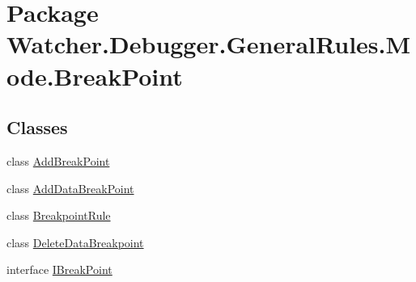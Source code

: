 \hypertarget{namespace_watcher_1_1_debugger_1_1_general_rules_1_1_mode_1_1_break_point}{\section{Package Watcher.\+Debugger.\+General\+Rules.\+Mode.\+Break\+Point}
\label{namespace_watcher_1_1_debugger_1_1_general_rules_1_1_mode_1_1_break_point}
}
\subsection*{Classes}
\begin{DoxyCompactItemize}
\item 
class \hyperlink{class_watcher_1_1_debugger_1_1_general_rules_1_1_mode_1_1_break_point_1_1_add_break_point}{Add\+Break\+Point}
\item 
class \hyperlink{class_watcher_1_1_debugger_1_1_general_rules_1_1_mode_1_1_break_point_1_1_add_data_break_point}{Add\+Data\+Break\+Point}
\item 
class \hyperlink{class_watcher_1_1_debugger_1_1_general_rules_1_1_mode_1_1_break_point_1_1_breakpoint_rule}{Breakpoint\+Rule}
\item 
class \hyperlink{class_watcher_1_1_debugger_1_1_general_rules_1_1_mode_1_1_break_point_1_1_delete_data_breakpoint}{Delete\+Data\+Breakpoint}
\item 
interface \hyperlink{interface_watcher_1_1_debugger_1_1_general_rules_1_1_mode_1_1_break_point_1_1_i_break_point}{I\+Break\+Point}
\end{DoxyCompactItemize}
